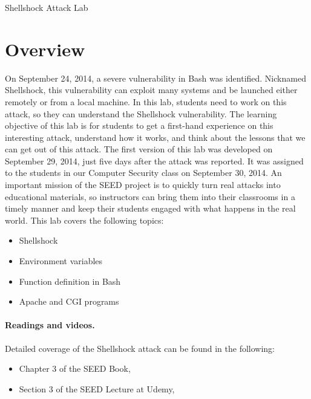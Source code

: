 



\newcommand{\bash}{{\tt bash}\xspace}
\newcommand{\Bash}{{\tt Bash}\xspace}




\begin{center}
{\LARGE Shellshock Attack Lab}
\end{center}


\section{Overview}

On September 24, 2014, a severe vulnerability in Bash was identified.
Nicknamed Shellshock, this vulnerability can exploit many systems and be
launched either remotely or from a local machine.  In this
lab, students need to work on this attack, so they can understand the
Shellshock vulnerability. The learning objective of this lab is for students to get a
first-hand experience on this interesting attack, understand how it
works, and think about the lessons that we can get out of this
attack. The first version of this lab was developed on September 29, 2014, 
just five days after the attack was reported. It was assigned to the students 
in our Computer Security class on September 30, 2014. An important mission
of the SEED project is to quickly turn real attacks 
into educational materials, so instructors can bring them into their
classrooms in a timely manner and keep their students engaged with what
happens in the real world. This lab covers the following topics:

\begin{itemize}[noitemsep]
\item Shellshock
\item Environment variables 
\item Function definition in Bash
\item Apache and CGI programs
\end{itemize}


\paragraph{Readings and videos.}
Detailed coverage of the Shellshock attack can be found in the following:

\begin{itemize}
\item Chapter 3 of the SEED Book, \seedbook
\item Section 3 of the SEED Lecture at Udemy, \seedcsvideo
\end{itemize}


